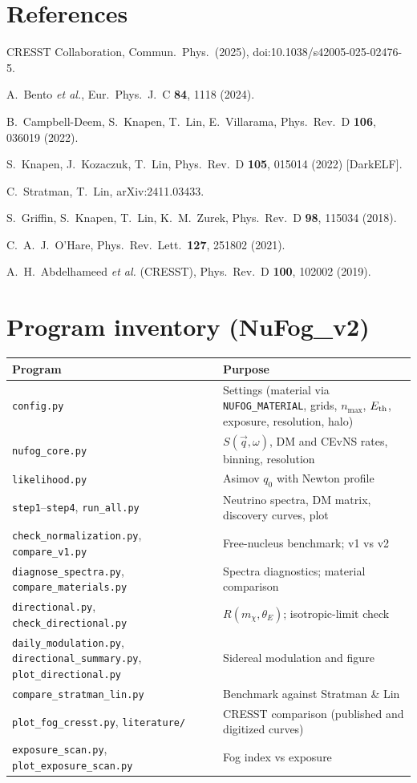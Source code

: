 \documentclass[11pt,a4paper]{article}
\numberwithin{equation}{section}
\newcommand{\qv}{\vec q}
\newcommand{\Eth}{E_{\rm th}}
\newcommand{\mchi}{m_\chi}
\begin{document}
\section*{References}
\small
\begin{enumerate}[label={[\arabic*]},leftmargin=*]
\item CRESST Collaboration, Commun.\ Phys.\ (2025), doi:10.1038/s42005-025-02476-5.
\item A.~Bento \emph{et al.}, Eur.\ Phys.\ J.\ C \textbf{84}, 1118 (2024).
\item B.~Campbell-Deem, S.~Knapen, T.~Lin, E.~Villarama, Phys.\ Rev.\ D \textbf{106}, 036019 (2022).
\item S.~Knapen, J.~Kozaczuk, T.~Lin, Phys.\ Rev.\ D \textbf{105}, 015014 (2022) [DarkELF].
\item C.~Stratman, T.~Lin, arXiv:2411.03433.
\item S.~Griffin, S.~Knapen, T.~Lin, K.~M.~Zurek, Phys.\ Rev.\ D \textbf{98}, 115034 (2018).
\item C.~A.~J.~O'Hare, Phys.\ Rev.\ Lett.\ \textbf{127}, 251802 (2021).
\item A.~H.~Abdelhameed \emph{et al.} (CRESST), Phys.\ Rev.\ D \textbf{100}, 102002 (2019).
\end{enumerate}

\appendix
\section{Program inventory (NuFog\_v2)}
\small
\begin{tabularx}{\textwidth}{>{\raggedright\arraybackslash}p{7.2cm}X}
\toprule
Program & Purpose\\
\midrule
\texttt{config.py} & Settings (material via \texttt{NUFOG\_MATERIAL}, grids, $n_{\max}$, $\Eth$, exposure, resolution, halo)\\
\texttt{nufog\_core.py} & $S(\qv,\omega)$, DM and CEvNS rates, binning, resolution\\
\texttt{likelihood.py} & Asimov $q_0$ with Newton profile\\
\texttt{step1}--\texttt{step4}, \texttt{run\_all.py} & Neutrino spectra, DM matrix, discovery curves, plot\\
\texttt{check\_normalization.py}, \texttt{compare\_v1.py} & Free-nucleus benchmark; v1 vs v2\\
\texttt{diagnose\_spectra.py}, \texttt{compare\_materials.py} & Spectra diagnostics; material comparison\\
\texttt{directional.py}, \texttt{check\_directional.py} & $R(\mchi,\theta_E)$; isotropic-limit check\\
\texttt{daily\_modulation.py}, \texttt{directional\_summary.py}, \texttt{plot\_directional.py} & Sidereal modulation and figure\\
\texttt{compare\_stratman\_lin.py} & Benchmark against Stratman \& Lin\\
\texttt{plot\_fog\_cresst.py}, \texttt{literature/} & CRESST comparison (published and digitized curves)\\
\texttt{exposure\_scan.py}, \texttt{plot\_exposure\_scan.py} & Fog index vs exposure\\
\bottomrule
\end{tabularx}
\end{document}
